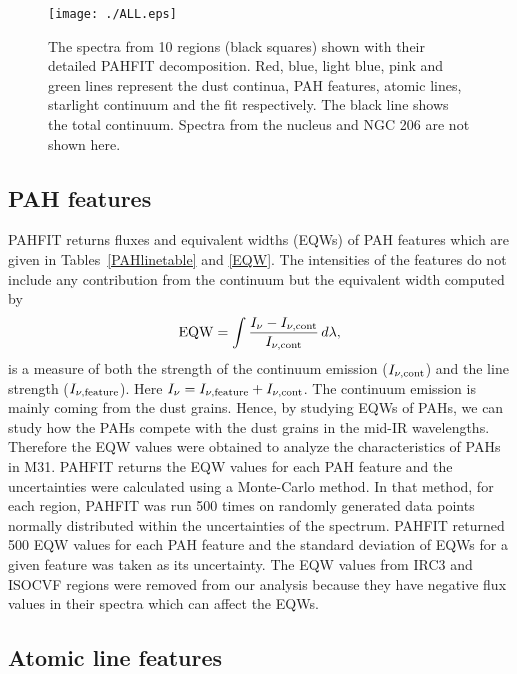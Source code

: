 \begin{figure}
\centering
\texttt{[image: ./ALL.eps]}
  \caption{The spectra from 10 regions (black squares) shown with their detailed PAHFIT decomposition. Red, blue, light blue, pink and green lines represent the dust continua, PAH features, atomic lines, starlight continuum and the fit respectively. The black line shows the total continuum. Spectra from the nucleus and NGC 206 are not shown here.}
\label{PAHFITplots}
\end{figure}


\subsection{PAH features}
\label{sect:pah}

PAHFIT returns fluxes and equivalent widths (EQWs) of PAH features which are given in Tables~\ref{PAHlinetable} and \ref{EQW}. The intensities of the features do not include any contribution from the continuum but the equivalent width computed by
\begin{equation}
{\rm EQW}=\int \frac{I_{\nu} - I_{\nu, {\rm cont}}}{I_{\nu, {\rm cont}}} \,d\lambda,
\end{equation}
is a measure of both the strength of the continuum emission ($I_{\nu, {\rm cont}} $) and the line strength ($I_{\nu,{\rm feature}}$). 
Here $I_{\nu} =I_{\nu,{\rm feature}}+ I_{\nu, {\rm cont}} $. 
The continuum emission is mainly coming from the dust grains. Hence, by studying EQWs of PAHs, we can study how the PAHs compete with the dust grains in the mid-IR wavelengths. Therefore the EQW values were obtained to analyze the characteristics of PAHs in M31. PAHFIT returns the EQW values for each PAH feature and the uncertainties were calculated using a Monte-Carlo method. In that method, for each region, PAHFIT was run 500 times on randomly generated data points  normally distributed within the uncertainties of the spectrum. PAHFIT returned 500 EQW values for each PAH feature and the standard deviation of EQWs for a given feature was taken as its uncertainty. 
The EQW values from IRC3 and ISOCVF regions were removed from our analysis because they have negative flux values in their spectra which can affect the EQWs. 


\subsection{Atomic line features}
\label{sect:atomic}

